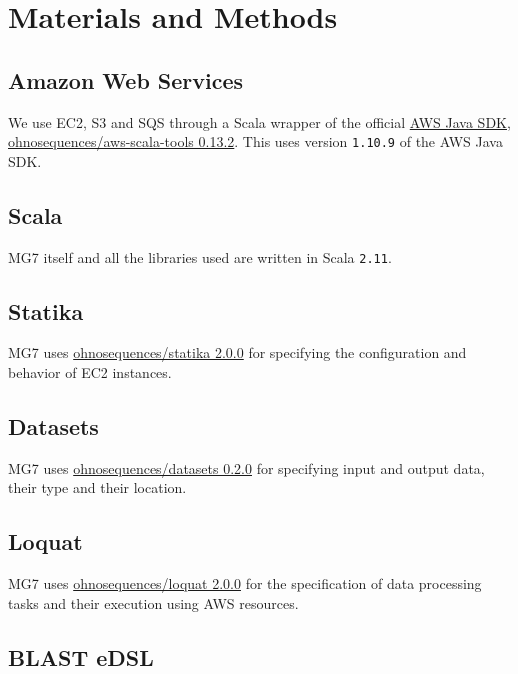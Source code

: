 \documentclass{frontiersSCNS} %
\begin{document}
\section{Materials and Methods}\label{materials-and-methods}

\subsection{Amazon Web Services}\label{amazon-web-services}

We use EC2, S3 and SQS through a Scala wrapper of the official
\href{https://aws.amazon.com/sdk-for-java/}{AWS Java SDK},
\href{https://github.com/ohnosequences/aws-scala-tools/???}{ohnosequences/aws-scala-tools
0.13.2}. This uses version \texttt{1.10.9} of the AWS Java SDK.

\subsection{Scala}\label{scala}

MG7 itself and all the libraries used are written in Scala
\texttt{2.11}.

\subsection{Statika}\label{statika}

MG7 uses
\href{https://github.com/statika/statika/releases/tag/v0.2.0}{ohnosequences/statika
2.0.0} for specifying the configuration and behavior of EC2 instances.

\subsection{Datasets}\label{datasets}

MG7 uses
\href{https://github.com/ohnosequences/datasets/releases/tag/v0.2.0}{ohnosequences/datasets
0.2.0} for specifying input and output data, their type and their
location.

\subsection{Loquat}\label{loquat}

MG7 uses
\href{https://github.com/ohnosequences/loquat/releases/tag/v2.0.0}{ohnosequences/loquat
2.0.0} for the specification of data processing tasks and their
execution using AWS resources.

\subsection{BLAST eDSL}\label{blast-edsl}
\end{document}
